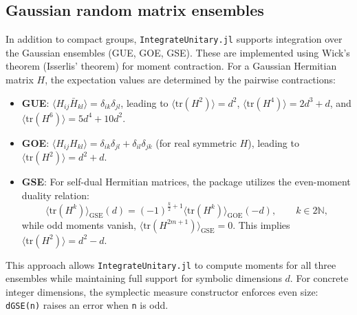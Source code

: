 \documentclass[manuscript,screen]{acmart}
\begin{document}
\subsection{Gaussian random matrix ensembles}
In addition to compact groups, \texttt{IntegrateUnitary.jl} supports integration over the
Gaussian ensembles (GUE, GOE, GSE). These are implemented using Wick's theorem
\cite{wick1950evaluation} (Isserlis' theorem) for moment contraction. For a
Gaussian Hermitian matrix $H$, the expectation values are determined by the
pairwise contractions:
\begin{itemize}
    \item \textbf{GUE}: $\langle H_{ij} \bar{H}_{kl} \rangle = \delta_{ik} \delta_{jl}$, leading to $\langle \mathrm{tr}(H^2) \rangle = d^2$, $\langle \mathrm{tr}(H^4) \rangle = 2d^3 + d$, and $\langle \mathrm{tr}(H^6) \rangle = 5d^4 + 10d^2$.
    \item \textbf{GOE}: $\langle H_{ij} H_{kl} \rangle = \delta_{ik} \delta_{jl} + \delta_{il} \delta_{jk}$ (for real symmetric $H$), leading to $\langle \mathrm{tr}(H^2) \rangle = d^2 + d$.
    \item \textbf{GSE}: For self-dual Hermitian matrices, the package utilizes
    the even-moment duality relation:
    \begin{equation}
    \langle \mathrm{tr}(H^k) \rangle_{\mathrm{GSE}}(d) = (-1)^{\frac{k}{2} + 1} \langle \mathrm{tr}(H^k) \rangle_{\mathrm{GOE}}(-d), \qquad k \in 2\mathbb{N},
    \end{equation}
    while odd moments vanish, $\langle \mathrm{tr}(H^{2m+1}) \rangle_{\mathrm{GSE}} = 0$.
    This implies $\langle \mathrm{tr}(H^2) \rangle = d^2 - d$.
\end{itemize}
This approach allows \texttt{IntegrateUnitary.jl} to compute moments for all three ensembles
while maintaining full support for symbolic dimensions $d$. For concrete integer
dimensions, the symplectic measure constructor enforces even size:
\texttt{dGSE(n)} raises an error when \texttt{n} is odd.
\end{document}
